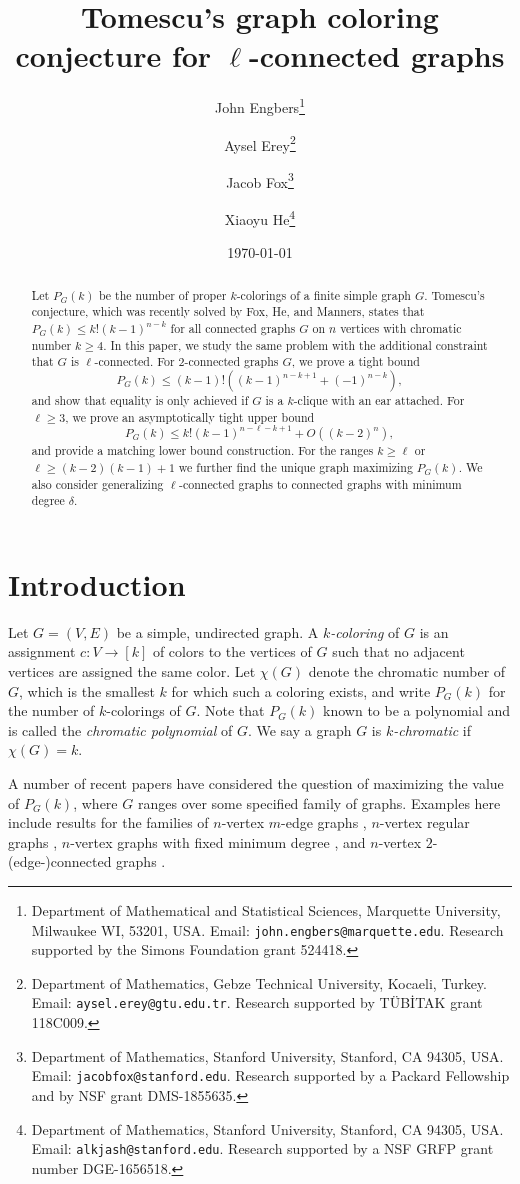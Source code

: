 \documentclass[11pt]{article}
\title{Tomescu's graph coloring conjecture for $\ell$-connected graphs}
\author{ John Engbers\thanks{Department of Mathematical and Statistical Sciences, Marquette University, Milwaukee WI, 53201, USA. Email: \texttt{john.engbers@marquette.edu}. Research supported by the Simons Foundation grant 524418.}
\and Aysel Erey\thanks{Department of Mathematics, Gebze Technical University, Kocaeli, Turkey. Email: \texttt{aysel.erey@gtu.edu.tr}. Research supported by T{\"U}B{\.I}TAK grant 118C009.} \and Jacob Fox\thanks{Department of Mathematics, Stanford University, Stanford,
CA 94305, USA. Email: {\tt jacobfox@stanford.edu}. Research supported by
a Packard Fellowship and by NSF grant DMS-1855635.} \and Xiaoyu He\thanks{Department of Mathematics, Stanford University, Stanford,
CA 94305, USA. Email: {\tt alkjash@stanford.edu}. Research supported by a NSF GRFP grant number DGE-1656518.}}
\date{\today }
\theoremstyle{plain}
\theoremstyle{definition}
\theoremstyle{remark}
\begin{document}
\maketitle

\begin{abstract}
Let $P_G(k)$ be the number of proper $k$-colorings of a finite simple graph $G$. Tomescu's conjecture, which was recently solved by Fox, He, and Manners, states that $P_G(k) \le k!(k-1)^{n-k}$ for all connected graphs $G$ on $n$ vertices with chromatic number $k\geq 4$. In this paper, we study the same problem with the additional constraint that $G$ is $\ell$-connected. For $2$-connected graphs $G$, we prove a tight bound
\[
P_G(k) \le (k-1)!((k-1)^{n-k+1} + (-1)^{n-k}),
\]
and show that equality is only achieved if $G$ is a $k$-clique with an ear attached. For $\ell \ge 3$, we prove an asymptotically tight upper bound
\[
P_G(k) \le k!(k-1)^{n-\ell - k + 1} + O((k-2)^n), 
\]
and provide a matching lower bound construction. For the ranges $k \geq \ell$ or $\ell \geq (k-2)(k-1)+1$ we further find the unique graph maximizing $P_G(k)$. We also consider generalizing $\ell$-connected graphs to connected graphs with minimum degree $\delta$.
    
\end{abstract}

\section{Introduction}

Let $G=(V,E)$ be a simple, undirected graph. A {\it $k$-coloring} of $G$ is an assignment $c:V\rightarrow [k]$ of colors to the vertices of $G$ such that no adjacent vertices are assigned the same color. Let $\chi(G)$ denote the chromatic number of $G$, which is the smallest $k$ for which such a coloring exists, and write $P_G(k)$ for the number of $k$-colorings of $G$. Note that $P_G(k)$ known to be a polynomial and is called the {\it chromatic polynomial} of $G$. We say a graph $G$ is {\it $k$-chromatic} if $\chi(G)=k$.

A number of recent papers have considered the question of maximizing the value of $P_{G}(k)$, where $G$ ranges over some specified family of graphs.  Examples here include results for the families of $n$-vertex $m$-edge graphs \cite{LPS,MN}, $n$-vertex regular graphs \cite{GalvinTetali,SSSZhao}, $n$-vertex graphs with fixed minimum degree \cite{Engbers,GuggiariScott}, and $n$-vertex $2$-(edge-)connected graphs \cite{EngGal,To94}. 
\end{document}
